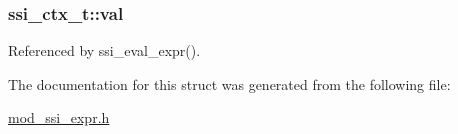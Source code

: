 \hypertarget{structssi__ctx__t_aee4366eefc1c48036a176cf2b5694097}{
\subsubsection[{val}]{ ssi\-\_\-ctx\-\_\-t\-::val}}\label{structssi__ctx__t_aee4366eefc1c48036a176cf2b5694097}


Referenced by ssi\-\_\-eval\-\_\-expr().



The documentation for this struct was generated from the following file\-:\begin{DoxyCompactItemize}
\item 
\hyperlink{mod__ssi__expr_8h}{mod\-\_\-ssi\-\_\-expr.\-h}\end{DoxyCompactItemize}
